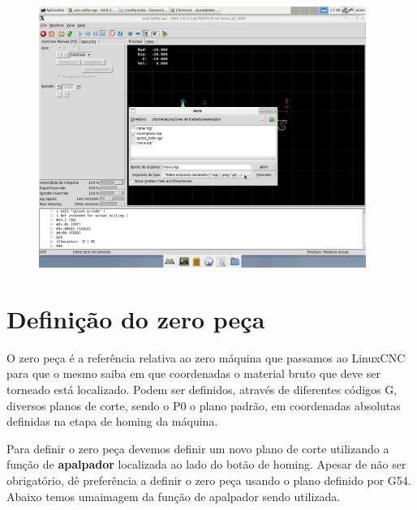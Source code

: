 \documentclass[twoside,a4paper]{refart}
\begin{document}
\begin{figure}[H]
    \begin{center}
        \includegraphics[width=0.95\textwidth]{imagens/Selecao_do_programa.png}
    \end{center}
    \caption{}\label{progselec2}
\end{figure}

\section{Definição do zero peça}

O zero peça é a referência relativa ao zero máquina que passamos ao LinuxCNC para que o mesmo saiba em que coordenadas o material bruto que deve ser torneado está localizado. Podem ser definidos, através de diferentes códigos G, diversos planos de corte, sendo o P0 o plano padrão, em coordenadas absolutas definidas na etapa de homing da máquina.

Para definir o zero peça devemos definir um novo plano de corte utilizando a função de \textbf{apalpador} localizada ao lado do botão de homing. Apesar de não ser obrigatório, dê preferência a definir o zero peça usando o plano definido por G54. Abaixo temos umaimagem da função de apalpador sendo utilizada.
\end{document}
